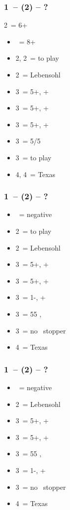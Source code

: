 \documentclass[12pt, a4paper]{article}
\begin{document}
\subsubsection*{1\ntx\ -- (2\diams\alrts) -- ?}
2\diams\ = 6+ \major
\begin{itemize}
    \item \dbl\ = 8+
    \item 2\hearts, 2\spades\ = to play
    \item 2\nt\ = Lebensohl
    \item 3\clubs\ = 5+\diams, \inv+
    \item 3\diams\ = 5+\hearts, \inv+
    \item 3\hearts\ = 5+\spades, \inv+
    \item 3\spades\ = 5/5 \minor
    \item 3\nt\ = to play
    \item 4\diams, 4\hearts\ = Texas
\end{itemize}


\subsubsection*{1\ntx\ -- (2\hearts) -- ?}
\begin{itemize}
    \item \dbl\ = negative
    \item 2\spades\ = to play
    \item 2\nt\ = Lebensohl
    \item 3\clubs\ = 5+\diams, \inv+
    \item 3\diams\ = 5+\spades, \inv+
    \item 3\hearts\ = 1-\hearts, \inv+
    \item 3\spades\ = 55 \minor, \gf
    \item 3\nt\ = no \hearts\ stopper
    \item 4\hearts\ = Texas
\end{itemize}

\subsubsection*{1\ntx\ -- (2\spades) -- ?}
\begin{itemize}
    \item \dbl\ = negative
    \item 2\nt\ = Lebensohl
    \item 3\clubs\ = 5+\diams, \inv+
    \item 3\diams\ = 5+\hearts, \inv+
    \item 3\hearts\ = 55 \minor, \gf
    \item 3\spades\ = 1-\spades, \inv+
    \item 3\nt\ = no \spades\ stopper
    \item 4\diams\ = Texas
\end{itemize}
\end{document}
